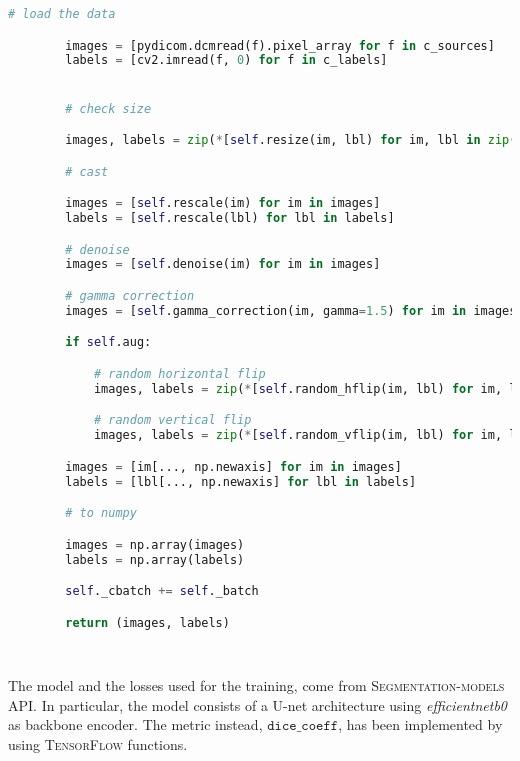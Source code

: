 \documentclass{standalone}
\begin{document}
\begin{lstlisting}[language = python, caption=Custom $\mathtt{DataGenerator}$ implementation]
        # load the data

        images = [pydicom.dcmread(f).pixel_array for f in c_sources]
        labels = [cv2.imread(f, 0) for f in c_labels]


        # check size

        images, labels = zip(*[self.resize(im, lbl) for im, lbl in zip(images, labels)])

        # cast

        images = [self.rescale(im) for im in images]
        labels = [self.rescale(lbl) for lbl in labels]

        # denoise
        images = [self.denoise(im) for im in images]

        # gamma correction
        images = [self.gamma_correction(im, gamma=1.5) for im in images]

        if self.aug:

            # random horizontal flip
            images, labels = zip(*[self.random_hflip(im, lbl) for im, lbl in zip(images, labels)])

            # random vertical flip
            images, labels = zip(*[self.random_vflip(im, lbl) for im, lbl in zip(images, labels)])

        images = [im[..., np.newaxis] for im in images]
        labels = [lbl[..., np.newaxis] for lbl in labels]

        # to numpy

        images = np.array(images)
        labels = np.array(labels)

        self._cbatch += self._batch

        return (images, labels)

    
\end{lstlisting}
The model and the losses used for the training, come from \textsc{Segmentation-models} API.
In particular, the model consists of a U-net architecture using \textit{efficientnetb0} as
backbone encoder.
The metric instead, $\mathtt{dice\_coeff}$, has been implemented by using \textsc{TensorFlow} functions.
\end{document}

